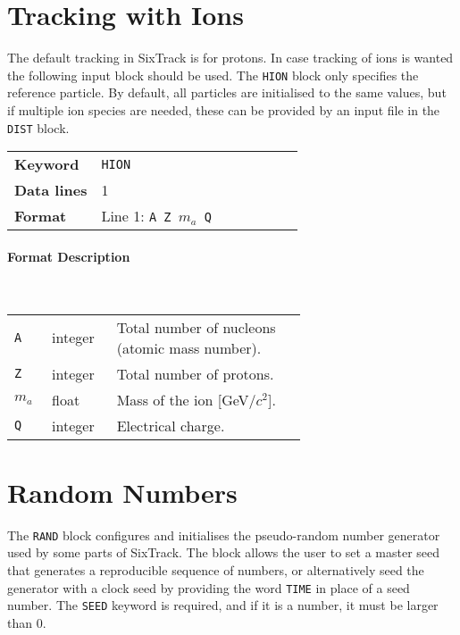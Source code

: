\section{Tracking with Ions} \label{hions}

The default tracking in SixTrack is for protons.
In case tracking of ions is wanted the following input block should be used.
The \texttt{HION} block only specifies the reference particle.
By default, all particles are initialised to the same values, but if multiple ion species are needed, these can be provided by an input file in the \texttt{DIST} block.

\bigskip
\begin{tabular}{@{}lp{0.7\linewidth}}
    \textbf{Keyword}    & \texttt{HION}\index{HION} \\
    \textbf{Data lines} & 1 \\
    \textbf{Format}     & Line 1: \texttt{A Z $m_a$ Q}
\end{tabular}

\paragraph{Format Description}~

\bigskip
\begin{longtabu}{@{}llp{0.65\linewidth}}
    \texttt{A}     & integer & Total number of nucleons (atomic mass number). \\
    \texttt{Z}     & integer & Total number of protons. \\
    \texttt{$m_a$} & float   & Mass of the ion [GeV/$c^2$]. \\
    \texttt{Q}     & integer & Electrical charge.
\end{longtabu}

\section{Random Numbers} \label{Input:RAND}

The \texttt{RAND} block configures and initialises the pseudo-random number generator used by some parts of SixTrack.
The block allows the user to set a master seed that generates a reproducible sequence of numbers, or alternatively seed the generator with a clock seed by providing the word \texttt{TIME} in place of a seed number.
The \texttt{SEED} keyword is required, and if it is a number, it must be larger than 0.

